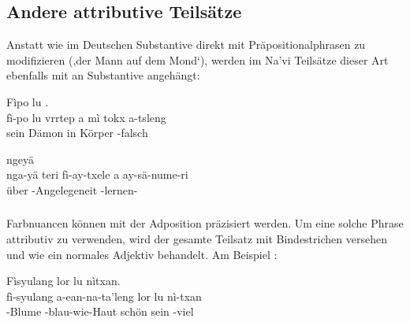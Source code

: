 \subsection{Andere attributive Teilsätze} Anstatt wie im Deutschen Substantive direkt mit Präpositionalphrasen zu modifizieren (,der Mann auf dem Mond‘), werden im Na'vi Teilsätze dieser Art ebenfalls mit  an Substantive angehängt: 

\begin{interlin} 
	\glll \Nfilm{}Fìpo lu     . \\
	fì-po lu vrrtep a mì tokx a-tsleng \\
	 sein Dämon  in Körper -falsch \\
\end{interlin}

\begin{interlin} 
	\glll \Npawl{}ngeyä     \\
	nga-yä teri fì-ay-txele a ay-sä-nume-ri \\
	 über -Angelegeneit  -lernen- \\
\end{interlin}

\subsubsection{} Farbnuancen können mit der Adposition   präzisiert werden. Um eine solche Phrase attributiv zu verwenden, wird der gesamte Teilsatz mit Bindestrichen versehen und wie ein normales Adjektiv behandelt. Am Beispiel  :\label{syn:attr:na}

\begin{interlin} 
	\glll \Npawl{}Fìsyulang  lor lu nìtxan. \\
	fì-syulang a-ean-na-ta'leng lor lu nì-txan \\
	-Blume -blau-wie-Haut schön sein -viel \\
\end{interlin}

